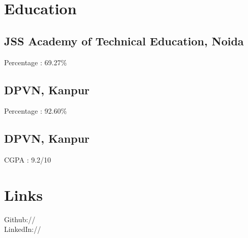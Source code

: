 \documentclass[]{deedy-resume-openfont}
\begin{document}
%
%
\lastupdated

%
%



%
%

\begin{minipage}[t]{0.33\textwidth} 


\section{Education} 

\subsection{JSS Academy of Technical Education, Noida}
Percentage : 69.27\% \\
\sectionsep


\subsection{DPVN, Kanpur}
Percentage : 92.60\% \\
\sectionsep

\subsection{DPVN, Kanpur}
CGPA : 9.2/10 \\
\sectionsep


\section{Links} 
Github:// \href{https://github.com/RHanda02}{}\\
LinkedIn://  \href{https://www.linkedin.com/in/rishabhhanda/}{} \\
\sectionsep


\end{minipage}
\end{document}
